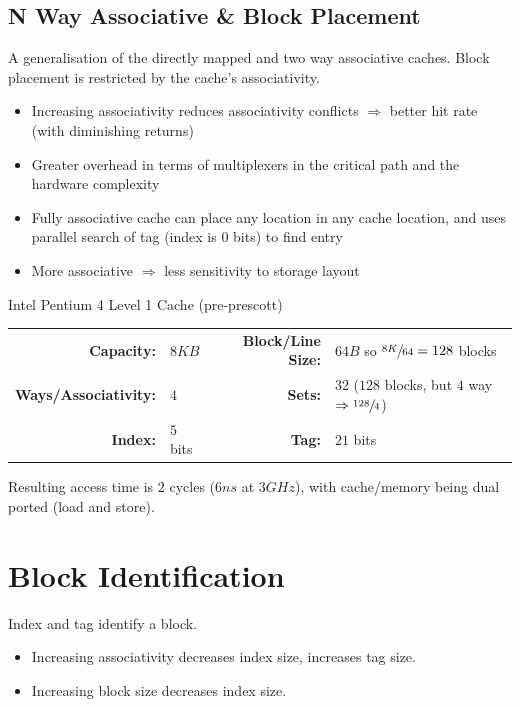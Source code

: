 \subsection{N Way Associative \& Block Placement}
A generalisation of the directly mapped and two way associative caches. Block placement is restricted by the cache's associativity.
\begin{itemize}
	\item Increasing associativity reduces associativity conflicts $\Rightarrow$ better hit rate (with diminishing returns)
	\item Greater overhead in terms of multiplexers in the critical path and the hardware complexity
	\item Fully associative cache can place any location in any cache location, and uses parallel search of tag (index is $0$ bits) to find entry
	\item More associative $\Rightarrow$ less sensitivity to storage layout
\end{itemize}
\begin{sidenotebox}{Intel Pentium 4 Level 1 Cache (pre-prescott)}
	\begin{center}
		\begin{tabular}{r l | r l}
			\textbf{Capacity:}           & $8KB$    & \textbf{Block/Line Size:} & $64B$ so $\sfrac{8K}{64} = 128$ blocks                        \\
			\textbf{Ways/Associativity:} & $4$      & \textbf{Sets:}            & $32$ ($128$ blocks, but $4$ way $\Rightarrow \sfrac{128}{4}$) \\
			\textbf{Index:}              & $5$ bits & \textbf{Tag:}             & $21$ bits                                                     \\
		\end{tabular}
	\end{center}
	Resulting access time is $2$ cycles ($6ns$ at $3GHz$), with cache/memory being dual ported (load and store).
\end{sidenotebox}

\section{Block Identification}
Index and tag identify a block.
\begin{itemize}
	\item Increasing associativity decreases index size, increases tag size.
	\item Increasing block size decreases index size.
\end{itemize}

